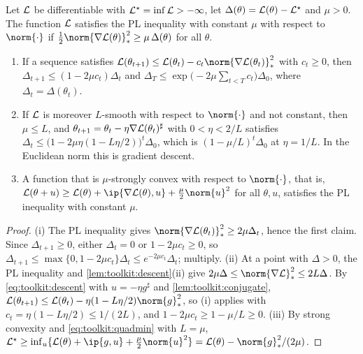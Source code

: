 \begin{refsection}
\begin{lemma}\label{lem:toolkit:pl}
Let $\mathcal{L}$ be differentiable with $\mathcal{L}^\star=\inf\mathcal{L}>-\infty$, let $\Delta(\theta)=\mathcal{L}(\theta)-\mathcal{L}^\star$ and $\mu>0$. The function $\mathcal{L}$ satisfies the PL inequality with constant $\mu$ with respect to $\norm{\cdot}$ if $\frac12\norm{\nabla\Loss(\theta)}_*^2\ge\mu\,\Delta(\theta)$ for all $\theta$.
\begin{enumerate}
\item If a sequence satisfies $\Loss(\theta_{t+1})\le\Loss(\theta_t)-c_t\norm{\nabla\Loss(\theta_t)}_*^2$ with $c_t\ge0$, then $\Delta_{t+1}\le(1-2\mu c_t)\Delta_t$ and $\Delta_T\le\exp\bigl(-2\mu\sum_{t<T}c_t\bigr)\Delta_0$, where $\Delta_t=\Delta(\theta_t)$.
\item If $\mathcal{L}$ is moreover $L$-smooth with respect to $\norm{\cdot}$ and not constant, then $\mu\le L$, and $\theta_{t+1}=\theta_t-\eta\nabla\mathcal{L}(\theta_t)^\sharp$ with $0<\eta<2/L$ satisfies $\Delta_t\le\bigl(1-2\mu\eta(1-L\eta/2)\bigr)^t\Delta_0$, which is $(1-\mu/L)^t\Delta_0$ at $\eta=1/L$. In the Euclidean norm this is gradient descent.
\item A function that is $\mu$-strongly convex with respect to $\norm{\cdot}$, that is, $\Loss(\theta+u)\ge\Loss(\theta)+\ip{\nabla\Loss(\theta),u}+\frac\mu2\norm{u}^2$ for all $\theta,u$, satisfies the PL inequality with constant $\mu$.
\end{enumerate}
\end{lemma}

\begin{proof}
(i) The PL inequality gives $\norm{\nabla\Loss(\theta_t)}_*^2\ge2\mu\Delta_t$, hence the first claim. Since $\Delta_{t+1}\ge0$, either $\Delta_t=0$ or $1-2\mu c_t\ge0$, so $\Delta_{t+1}\le\max\{0,1-2\mu c_t\}\Delta_t\le e^{-2\mu c_t}\Delta_t$; multiply. (ii) At a point with $\Delta>0$, the PL inequality and \cref{lem:toolkit:descent}(ii) give $2\mu\Delta\le\norm{\nabla\Loss}_*^2\le2L\Delta$. By \eqref{eq:toolkit:descent} with $u=-\eta g^\sharp$ and \cref{lem:toolkit:conjugate}, $\Loss(\theta_{t+1})\le\Loss(\theta_t)-\eta(1-L\eta/2)\norm{g}_*^2$, so (i) applies with $c_t=\eta(1-L\eta/2)\le1/(2L)$, and $1-2\mu c_t\ge1-\mu/L\ge0$. (iii) By strong convexity and \eqref{eq:toolkit:quadmin} with $L=\mu$, $\Loss^\star\ge\inf_u\{\Loss(\theta)+\ip{g,u}+\frac\mu2\norm{u}^2\}=\Loss(\theta)-\norm{g}_*^2/(2\mu)$.
\end{proof}


\end{refsection}
